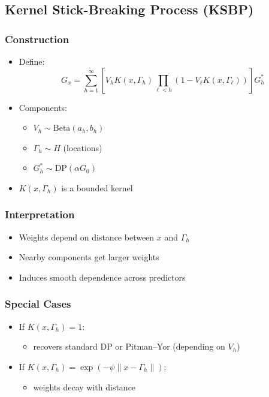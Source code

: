 \documentclass[12pt,oneside]{book}
\numberwithin{equation}{section}
\theoremstyle{definition}
\theoremstyle{plain}
\theoremstyle{remark}
\begin{document}
\subsection{Kernel Stick-Breaking Process (KSBP)}

\subsubsection*{Construction}
\begin{itemize}
\item Define:
\[
G_x = \sum_{h=1}^\infty \left[ V_h K(x, \Gamma_h) \prod_{\ell<h}(1 - V_\ell K(x, \Gamma_\ell)) \right] G_h^*
\]
\item Components:
\begin{itemize}
\item $V_h \sim \text{Beta}(a_h, b_h)$
\item $\Gamma_h \sim H$ (locations)
\item $G_h^* \sim \mathrm{DP}(\alpha G_0)$
\end{itemize}
\item $K(x,\Gamma_h)$ is a bounded kernel
\end{itemize}

\subsubsection*{Interpretation}
\begin{itemize}
\item Weights depend on distance between $x$ and $\Gamma_h$
\item Nearby components get larger weights
\item Induces smooth dependence across predictors
\end{itemize}

\subsubsection*{Special Cases}
\begin{itemize}
\item If $K(x,\Gamma_h)=1$:
\begin{itemize}
\item recovers standard DP or Pitman--Yor (depending on $V_h$)
\end{itemize}
\item If $K(x,\Gamma_h)=\exp(-\psi\|x-\Gamma_h\|)$:
\begin{itemize}
\item weights decay with distance
\end{itemize}
\end{itemize}
\end{document}
